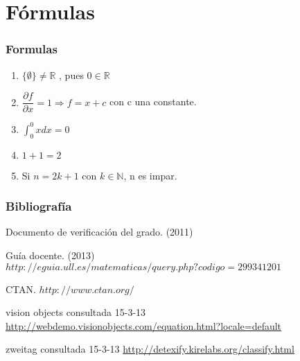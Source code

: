 \documentclass{beamer}
\begin{document}
\section{Fórmulas} 

\begin{frame}
  \frametitle{Formulas} 

\begin{example}
\begin{enumerate}
\item $ \{\emptyset\} \neq \mathbb{R} $ , pues $ 0 \in  \mathbb{R}$
\item $\dfrac {\partial f} {\partial x}=1 \Rightarrow f=x+c$ con c una constante.
\item $\int _{0}^{0} x dx =0$
\item $1+1=2$
\item Si $n=2k+1$ con $ k\in \mathbb{N}$, n es impar.
\end{enumerate}

\end{example}


\end{frame}

\begin{frame}
  \frametitle{Bibliografía}

  \begin{thebibliography}{10}

    \beamertemplatebookbibitems
    Documento de verificación del grado. 
    (2011) 

    \beamertemplatebookbibitems
    Guía docente. 
    (2013) 
    {\small $http://eguia.ull.es/matematicas/query.php?codigo=299341201$}

    \beamertemplatebookbibitems
    CTAN. {\small $http://www.ctan.org/$}

    \beamertemplatebookbibitems
    vision objects consultada 15-3-13 {\small \url{http://webdemo.visionobjects.com/equation.html?locale=default}}
    
    
    
    \beamertemplatebookbibitems
     zweitag consultada 15-3-13 {\small \url{http://detexify.kirelabs.org/classify.html}}
     
     
     
  \end{thebibliography}
\end{frame}


\end{document}
